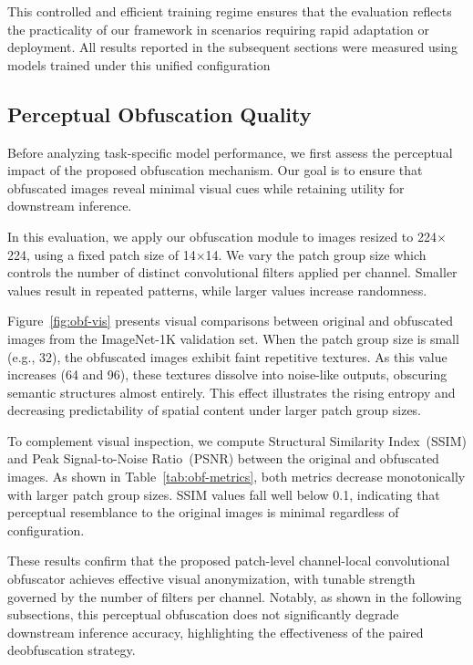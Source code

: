 \documentclass{ieeeaccess}
\begin{document}
This controlled and efficient training regime ensures that the evaluation reflects the practicality of our framework in scenarios requiring rapid adaptation or deployment. All results reported in the subsequent sections were measured using models trained under this unified configuration

\subsection{Perceptual Obfuscation Quality}





Before analyzing task-specific model performance, we first assess the perceptual impact of the proposed obfuscation mechanism. Our goal is to ensure that obfuscated images reveal minimal visual cues while retaining utility for downstream inference.

In this evaluation, we apply our obfuscation module to images resized to 224$\times$224, using a fixed patch size of 14$\times$14. We vary the patch group size which controls the number of distinct convolutional filters applied per channel. Smaller values result in repeated patterns, while larger values increase randomness.

Figure~\ref{fig:obf-vis} presents visual comparisons between original and obfuscated images from the ImageNet-1K validation set. When the patch group size is small (e.g., 32), the obfuscated images exhibit faint repetitive textures. As this value increases (64 and 96), these textures dissolve into noise-like outputs, obscuring semantic structures almost entirely. This effect illustrates the rising entropy and decreasing predictability of spatial content under larger patch group sizes.

To complement visual inspection, we compute Structural Similarity Index~(SSIM) and Peak Signal-to-Noise Ratio~(PSNR) between the original and obfuscated images. As shown in Table~\ref{tab:obf-metrics}, both metrics decrease monotonically with larger patch group sizes. SSIM values fall well below 0.1, indicating that perceptual resemblance to the original images is minimal regardless of configuration.

These results confirm that the proposed patch-level channel-local convolutional obfuscator achieves effective visual anonymization, with tunable strength governed by the number of filters per channel. Notably, as shown in the following subsections, this perceptual obfuscation does not significantly degrade downstream inference accuracy, highlighting the effectiveness of the paired deobfuscation strategy.
\end{document}
